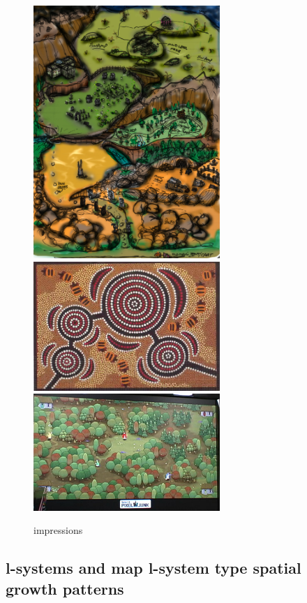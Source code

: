 \documentclass{article}
\begin{document}
\begin{figure}
\centering
  \begin{center}
	\includegraphics[width=200pt]{images/map_design.jpg}
	\includegraphics[width=200pt]{images/aboriginal_art.jpg}
	\includegraphics[width=200pt]{images/forest.jpg}
\end{center}
	\caption{impressions}\label{fig:global_map}
\end{figure}




\subsection{l-systems and map l-system type spatial growth patterns}
\end{document}
